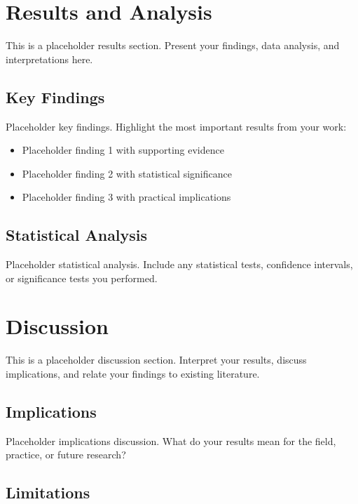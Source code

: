 \section{Results and Analysis}\label{sec:results-analysis}

This is a placeholder results section. Present your findings, data analysis, and interpretations here.

\subsection{Key Findings}\label{subsec:key-findings}

Placeholder key findings. Highlight the most important results from your work:

\begin{itemize}
\item Placeholder finding 1 with supporting evidence
\item Placeholder finding 2 with statistical significance
\item Placeholder finding 3 with practical implications
\end{itemize}

\subsection{Statistical Analysis}\label{subsec:statistical-analysis}

Placeholder statistical analysis. Include any statistical tests, confidence intervals, or significance tests you performed.

\section{Discussion}\label{sec:discussion}

This is a placeholder discussion section. Interpret your results, discuss implications, and relate your findings to existing literature.

\subsection{Implications}\label{subsec:implications}

Placeholder implications discussion. What do your results mean for the field, practice, or future research?

\subsection{Limitations}\label{subsec:limitations}

